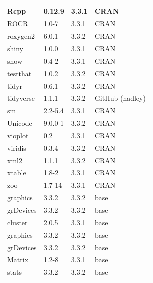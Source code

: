 \begin{longtable}{@{\extracolsep{\fill}}|llll|@{}}
Rcpp         & 0.12.9         & 3.3.1 & CRAN            \\ \hline
ROCR         & 1.0-7          & 3.3.1 & CRAN            \\ \hline
roxygen2     & 6.0.1          & 3.3.2 & CRAN            \\ \hline
shiny        & 1.0.0          & 3.3.1 & CRAN            \\ \hline
snow         & 0.4-2          & 3.3.1 & CRAN            \\ \hline
testthat     & 1.0.2          & 3.3.2 & CRAN            \\ \hline
tidyr        & 0.6.1          & 3.3.2 & CRAN            \\ \hline
tidyverse    & 1.1.1          & 3.3.2 & GitHub (hadley) \\ \hline
sm           & 2.2-5.4        & 3.3.1 & CRAN            \\ \hline
Unicode      & 9.0.0-1        & 3.3.2 & CRAN            \\ \hline
vioplot      & 0.2            & 3.3.1 & CRAN            \\ \hline
viridis      & 0.3.4          & 3.3.2 & CRAN            \\ \hline
xml2         & 1.1.1          & 3.3.2 & CRAN            \\ \hline
xtable       & 1.8-2          & 3.3.1 & CRAN            \\ \hline
zoo          & 1.7-14         & 3.3.1 & CRAN            \\ \hline
graphics     & 3.3.2          & 3.3.2 & base            \\ \hline
grDevices    & 3.3.2          & 3.3.2 & base            \\ \hline
cluster      & 2.0.5          & 3.3.1 & base            \\ \hline
graphics     & 3.3.2          & 3.3.2 & base            \\ \hline
grDevices    & 3.3.2          & 3.3.2 & base            \\ \hline
Matrix       & 1.2-8          & 3.3.1 & base            \\ \hline
stats        & 3.3.2          & 3.3.2 & base            \\ \hline
\end{longtable}

